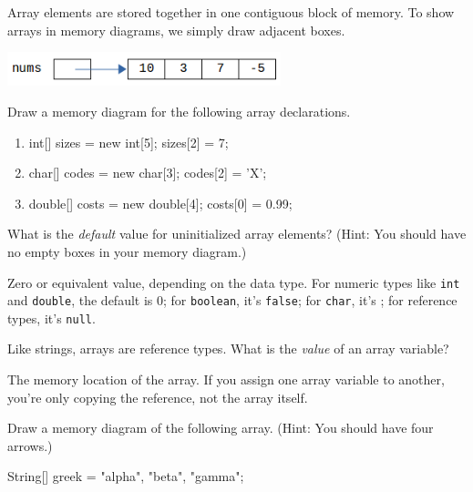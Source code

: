 
Array elements are stored together in one contiguous block of memory. To show arrays in memory diagrams, we simply draw adjacent boxes.

\begin{center}

\vspace{1ex}
\includegraphics[width=225pt]{CS1/array-diagram1.png}
\end{center}




\Q Draw a memory diagram for the following array declarations.

\begin{enumerate}

\item
\begin{javalst}
int[] sizes = new int[5];
sizes[2] = 7;
\end{javalst}

\item
\begin{javalst}
char[] codes = new char[3];
codes[2] = 'X';
\end{javalst}

\item
\begin{javalst}
double[] costs = new double[4];
costs[0] = 0.99;
\end{javalst}

\end{enumerate}


\Q What is the \emph{default} value for uninitialized array elements? (Hint: You should have no empty boxes in your memory diagram.)

\begin{answer}
Zero or equivalent value, depending on the data type.
For numeric types like {\tt int} and {\tt double}, the default is 0; for {\tt boolean}, it's {\tt false}; for {\tt char}, it's {\tt {}\qs}; for reference types, it's {\tt null}.
\end{answer}


\Q Like strings, arrays are reference types. What is the \emph{value} of an array variable?

\begin{answer}
The memory location of the array. If you assign one array variable to another, you're only copying the reference, not the array itself.
\end{answer}


\Q Draw a memory diagram of the following array.
(Hint: You should have four arrows.)

\begin{javalst}
String[] greek = {"alpha", "beta", "gamma"};
\end{javalst}

\begin{answer}
\end{answer}
